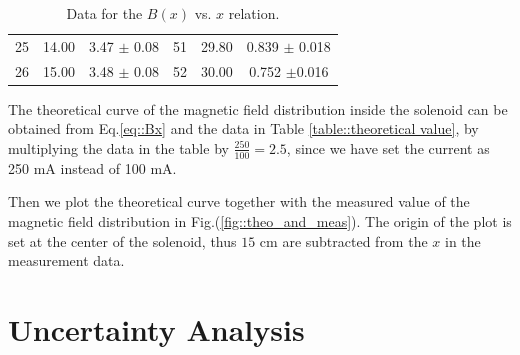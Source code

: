 \documentclass[a4paper]{article}
\begin{document}
\begin{table}[H]
\begin{tabular}{ccc||ccc}
		25 & 14.00                                      & 3.47 $\pm$ 0.08                 & 51 & 29.80                                      & 0.839 $\pm$ 0.018               \\
		26 & 15.00                                      & 3.48 $\pm$ 0.08                 & 52 & 30.00                                      & 0.752 $\pm$0.016                \\
		\hline
	\end{tabular}
	\caption{Data for the $B(x)$ vs. $x$ relation.}\label{TableBx}
\end{table}

The theoretical curve of the magnetic field distribution inside the solenoid can be obtained from Eq.\eqref{eq::Bx} and the data in Table \ref{table::theoretical value}, by multiplying the data in the table by $\frac{250}{100} = 2.5$, since we have set the current as 250 mA instead of 100 mA.

Then we plot the theoretical curve together with the measured value of the magnetic field distribution in Fig.(\ref{fig::theo_and_meas}).
The origin of the plot is set at the center of the solenoid, thus $15$ cm are subtracted from the $x$ in the measurement data.


\section{Uncertainty Analysis}
\end{document}
